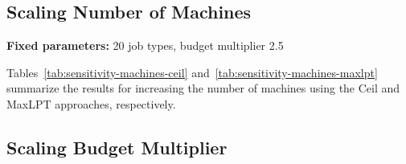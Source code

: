 \subsection{Scaling Number of Machines}

\textbf{Fixed parameters:} 20 job types, budget multiplier 2.5



Tables~\ref{tab:sensitivity-machines-ceil} and~\ref{tab:sensitivity-machines-maxlpt} summarize the results for increasing the number of machines using the Ceil and MaxLPT approaches, respectively.

\begin{table}[htbp]
\centering
\caption{Sensitivity analysis (Ceil): scaling number of machines}
\label{tab:sensitivity-machines-ceil}
\end{table}

\begin{table}[htbp]
\centering
\caption{Sensitivity analysis (MaxLPT): scaling number of machines}
\label{tab:sensitivity-machines-maxlpt}
\end{table}



\subsection{Scaling Budget Multiplier}


